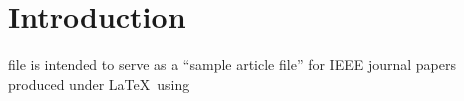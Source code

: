 
\section{Introduction}
 file is intended to serve as a ``sample article file''
for IEEE journal papers produced under \LaTeX\ using \lipsum[2]
